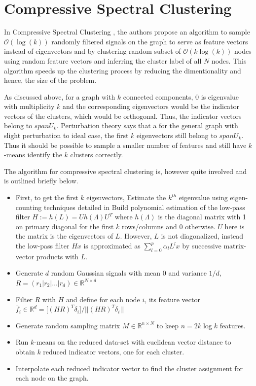 \documentclass[10pt,a4paper, nocenter]{report}
\newcommand{\norm}[1]{\lvert\lvert {#1} \rvert\rvert}
\begin{document}
    \section{Compressive Spectral Clustering}
    In Compressive Spectral Clustering \cite{tremblay-compressive-SC-16}, the authors propose an algorithm to sample $\mathcal{O}(\log(k))$ randomly filtered signals on the graph to serve as feature vectors instead of eigenvectors and by clustering random subset of $\mathcal{O}(k\log(k))$ nodes using random feature vectors and inferring the cluster label of all $N$ nodes. This algorithm speeds up the clustering process by reducing the dimentionality and hence, the size of the problem.

    As discussed above, for a graph with $k$ connected components, 0 is eigenvalue with multiplicity $k$ and the corresponding eigenvectors would be the indicator vectors of the clusters, which would be orthogonal. Thus, the indicator vectors belong to $span{U_k}$. Perturbation theory says that a for the general graph with slight perturbation to ideal case, the first $k$ eigenvectors still belong to $span{U_k}$. Thus it should be possible to sample a smaller number of features and still have $k$-means identify the $k$ clusters correctly. 

    The algorithm for compressive spectral clustering is, however quite involved and is outlined briefly below. 

    \begin{itemize}
        \item First, to get the first $k$ eigenvectors,  
            \subitem Estimate the $k^{th}$ eigenvalue using eigen-counting techniques detailed in \cite{Di13efficientestimation} 
            \subitem Build polynomial estimation of the low-pass filter $H := h(L) = U h(\Lambda) U^T$ where $h({\Lambda})$ is the diagonal matrix with 1 on primary diagonal for the first $k$ rows/columns and 0 otherwise. $U$ here is the matrix is the eigenvectors of $L$. However, $L$ is not diagonalized, instead the low-pass filter $Hx$ is approximated as $\sum_{l=0}^{p}\alpha_l L^{l}x$ by successive matrix-vector products with $L$.
        \item  Generate $d$ random Gaussian signals with mean $0$ and variance $1/d$, $R = (r_1|r_2|\dots|r_d) \in \mathbb{R}^{N\times d}$
        \item Filter $R$ with $H$ and define for each node $i$, its feature vector $\bar{f}_i \in \mathbb{R}^d = \big[ (HR)^T \delta_i \big] / \norm{(HR)^T \delta_i} $
        \item Generate random sampling matrix $M\in \mathbb{R}^{n\times N}$ to keep $n=2k \log{k}$ features. 
        \item Run $k$-means on the reduced data-set with euclidean vector distance to obtain $k$ reduced indicator vectors, one for each cluster. 
        \item Interpolate each reduced indicator vector to find the cluster assignment for each node on the graph.
    \end{itemize}
\end{document}
